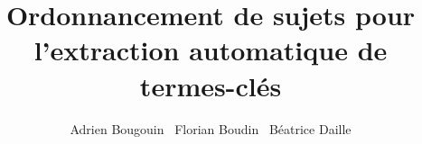 \documentclass[utf8]{article-hermes}
\title[Titre court]{Ordonnancement de sujets pour l'extraction automatique de
                    termes-clés}
\author{Adrien Bougouin\fup{*} \andauthor\ Florian Boudin\fup{*} \andauthor\ Béatrice Daille\fup{*}}
\begin{document}
\maketitlepage



%
\end{document}
